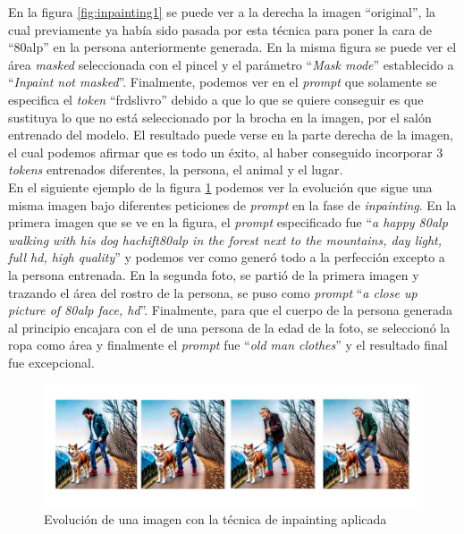 \begin{itemize}
En la figura \ref{fig:inpainting1} se puede ver a la derecha la imagen ``original'', la cual previamente ya había sido pasada por esta técnica para poner la cara de ``80alp'' en la persona anteriormente generada. En la misma figura se puede ver el área \textit{masked} seleccionada con el pincel y el parámetro ``\textit{Mask mode}'' establecido a ``\textit{Inpaint not masked}''. Finalmente, podemos ver en el \textit{prompt} que solamente se especifica el \textit{token} ``frdslivro'' debido a que lo que se quiere conseguir es que sustituya lo que no está seleccionado por la brocha en la imagen, por el salón entrenado del modelo. El resultado puede verse en la parte derecha de la imagen, el cual podemos afirmar que es todo un éxito, al haber conseguido incorporar 3 \textit{tokens} entrenados diferentes, la persona, el animal y el lugar. \\

En el siguiente ejemplo de la figura \ref{fig:fasesinpainting} podemos ver la evolución que sigue una misma imagen bajo diferentes peticiones de \textit{prompt} en la fase de \textit{inpainting}. En la primera imagen que se ve en la figura, el \textit{prompt} especificado fue ``\textit{a happy 80alp walking with his dog hachift80alp in the forest next to the mountains, day light, full hd, high quality}'' y podemos ver como generó todo a la perfección excepto a la persona entrenada. En la segunda foto, se partió de la primera imagen y trazando el área del rostro de la persona, se puso como \textit{prompt} ``\textit{a close up picture of 80alp face, hd}''. Finalmente, para que el cuerpo de la persona generada al principio encajara con el de una persona de la edad de la foto, se seleccionó la ropa como área y finalmente el \textit{prompt} fue ``\textit{old man clothes}'' y el resultado final fue excepcional. \\

\begin{figure}[h]
	\centering
	\includegraphics[width = 1.1
	\textwidth]{Imagenes/Vectorial/fasesinpainting.png}
	\caption{Evolución de una imagen con la técnica de inpainting aplicada}
	\label{fig:fasesinpainting}
\end{figure}


\end{itemize}
